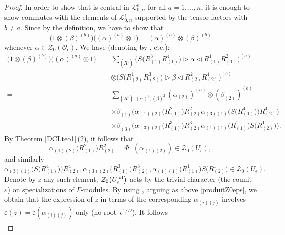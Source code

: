 \documentclass[10pt,a4paper]{amsart}
\numberwithin{equation}{section}
\theoremstyle{definition}
\newcommand{\e}{\epsilon}
\newcommand{\Ll}{{\mathcal L}}
\newcommand{\Oo}{{\mathcal O}}
\begin{document}
\begin{proof}
In order to show that \smash{$\mathcal{Z}_0(\Oo_\e)^{(a)}$} is central in $\Ll_{0,n}^\e$ for all $a=1,\dots,n$, it is enough to show \smash{$\mathcal{Z}_0(\Oo_\e)^{(a)}$} commutes with the elements of $\Ll_{0,n}^\e$ supported by the tensor factors \smash{$\bigl(\Ll_{0,1}^\e\bigr)^{(b)}$} with $b\ne a$. Since  by the definition, we have to show that \[\big(1\!\otimes\! (\beta)^{(b)}\big)\big((\alpha)^{(a)} \!\otimes \!1\big) = (\alpha)^{(a)}\!\otimes\! (\beta)^{(b)}\] whenever $\alpha\!\in \!\mathcal{Z}_0(\Oo_\e)$. We have (denoting \smash{$ \sum_{(\alpha),(\alpha),(\alpha),(\alpha)}$} by ,  etc.):
\begin{align*}
\big(1\otimes (\beta)^{(b)}\big) \big((\alpha)^{(a)} \otimes 1\big) ={}&\sum_{\scriptscriptstyle(R^i)} \big(S\big(R^3_{(1)}R^4_{(1)}\big)\rhd \alpha \lhd R^1_{(1)}R^2_{(1)}\big)^{(a)} \\
&\otimes \big(S\big(R^1_{(2)}R^3_{(2)}\big) \rhd \beta \lhd R^2_{(2)}R^4_{(2)}\big)^{(b)}
\\
={}&\sum_{\scriptscriptstyle(R^i),(\alpha)^4,(\beta)^2} (\alpha_{(2)})^{(a)}\otimes (\beta_{(2)})^{(b)}\\
& \times \beta_{(1)}\big(\alpha_{(1)(2)}\big(R^2_{(1)}\big) R^2_{(2)} \alpha_{(3)(1)}\big(S\big(R^4_{(1)}\big)\big) R^4_{(2)}\big)\\
& \times \beta_{(3)}\big(\alpha_{(3)(2)}\big(R^3_{(1)}\big)R^3_{(2)} \alpha_{(1)(1)}\big(R^1_{(1)}\big) S\big(R^1_{(2)}\big)\big).
\end{align*}
By Theorem \ref{DCLteo1}\,(2), it follows that
\[
\alpha_{(1)(2)}\big(R^2_{(1)}\big) R^2_{(2)} = \Phi^+(\alpha_{(1)(2)}) \in \mathcal{Z}_0(U_\epsilon),
\]
 and similarly
\[
\alpha_{(3)(1)}\big(S\big(R^4_{(1)}\big)\big) R^4_{(2)}, \alpha_{(3)(2)}\big(R^3_{(1)}\big)R^3_{(2)}, \alpha_{(1)(1)}\big(R^1_{(1)}\big) S\big(R^1_{(2)}\big) \in \mathcal{Z}_0(U_\epsilon).
\]
 Denote by $z$ any such element; ${\mathcal Z}_0\big(U_\epsilon^{\rm ad}\big)$ acts by the trivial character (the counit $\varepsilon$) on specializations of $\Gamma$-modules. By using \cite[Proposition 6.2]{BR}, arguing as above \eqref{produitZ0eps}, we obtain that the expression of $z$ in terms of the corresponding $\alpha_{(i)(j)}$ involves $\varepsilon(z)= \varepsilon(\alpha_{(i)(j)})$ only \big(no root~$\epsilon^{1/D}$\big). It follows
\begin{gather*}

\end{gather*}
\end{proof}
\end{document}

